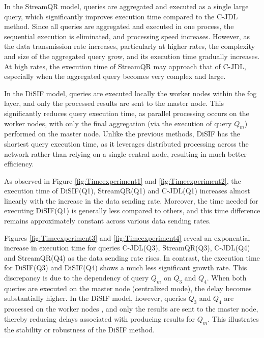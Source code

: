 \documentclass[5p,times]{elsarticle}
\begin{document}
\begin{itemize}
In the StreamQR model, queries are aggregated and executed as a single large query,
 which significantly improves execution time compared to the C-JDL method.
  Since all queries are aggregated and executed in one process, the sequential execution
   is eliminated, and processing speed increases. However, as the data transmission rate
    increases, particularly at higher rates, the complexity and size of the aggregated query
     grow, and its execution time gradually increases. At high rates, the execution time
      of StreamQR may approach that of C-JDL, especially when the aggregated query
       becomes very complex and large.


In the DiSIF model, queries are executed locally the worker nodes within the fog layer,
 and only the processed results are sent to the master node.
  This significantly reduces query execution time, as parallel processing occurs
   on the worker nodes, with only the final aggregation (via the execution of query $Q_m$)
    performed on the master node. Unlike the previous methods, DiSIF has the shortest query
     execution time, as it leverages distributed processing across the network rather than
      relying on a single central node, resulting in much better efficiency.




As observed in Figure \ref{fig:Timeexperiment1} and \ref{fig:Timeexperiment2},
 the execution time of DiSIF(Q1), StreamQR(Q1) and C-JDL(Q1) increases almost linearly
  with the increase in the data sending rate. Moreover,
   the time needed for executing DiSIF(Q1) is generally less compared
    to others, and this time difference remains approximately constant across various data
     sending rates.


Figures \ref{fig:Timeexperiment3} and \ref{fig:Timeexperiment4} reveal an exponential
 increase in execution time for queries C-JDL(Q3), StreamQR(Q3), C-JDL(Q4) and StreamQR(Q4)
  as the data sending rate rises. In contrast, the execution time for DiSIF(Q3)
   and DiSIF(Q4) shows a much less significant growth rate. This discrepancy is due
    to the dependency of query $Q_m$ on $Q_3$ and $Q_4$. When both queries are executed
     on the master node (centralized mode), the delay becomes substantially higher.
      In the DiSIF model, however, queries $Q_3$ and $Q_4$ are processed on the worker nodes
      , and only the results are sent to the master node, 
      thereby reducing delays associated with producing results for $Q_m$.
This illustrates the stability or robustness of the DiSIF method.


\end{itemize} 
\end{document}
